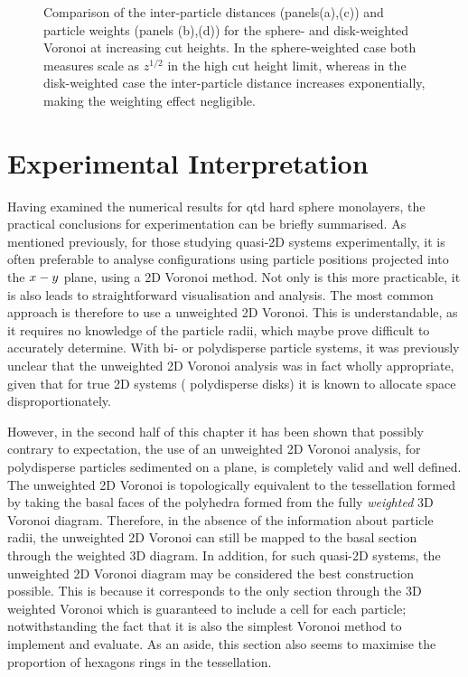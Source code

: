 \begin{figure}
	\caption{Comparison of the inter\--particle distances (panels(a),(c)) and particle weights (panels (b),(d)) for the sphere\-- and disk\--weighted Voronoi at increasing cut heights. In the sphere\--weighted case both measures scale as $z^{1/2}$ in the high cut height limit, whereas in the disk\--weighted case the inter\--particle distance increases exponentially, making the weighting effect negligible.}
	\label{fig:wd}
\end{figure}

\section{Experimental Interpretation}

Having examined the numerical results for qtd{} hard sphere monolayers, the practical conclusions for experimentation can be briefly summarised.
As mentioned previously, for those studying quasi\--2D systems experimentally, it is often preferable to analyse configurations using particle positions projected into the $x\--y$ plane, using a 2D Voronoi method.
Not only is this more practicable, it is also leads to straightforward visualisation and analysis.
The most common approach is therefore to use a unweighted 2D Voronoi.
This is understandable, as it requires no knowledge of the particle radii, which maybe prove difficult to accurately determine.
With bi\-- or polydisperse particle systems, it was previously unclear that the unweighted 2D Voronoi analysis was in fact wholly appropriate, given that for true 2D systems (\eg{} polydisperse disks) it is known to allocate space disproportionately. 
 
However, in the second half of this chapter it has been shown that possibly contrary to expectation, the use of an unweighted 2D Voronoi analysis, for polydisperse particles sedimented on a plane, is completely valid and well defined.
The unweighted 2D Voronoi is topologically equivalent to the tessellation formed by taking the basal faces of the polyhedra formed from the fully \textit{weighted} 3D Voronoi diagram.
Therefore, in the absence of the information about particle radii, the unweighted 2D Voronoi can still be mapped to the basal section through the weighted 3D diagram.
In addition, for such quasi\--2D systems, the unweighted 2D Voronoi diagram may be considered the best construction possible. 
This is because it corresponds to the only section through the 3D weighted Voronoi which is guaranteed to include a cell for each particle; notwithstanding the fact that it is also the simplest Voronoi method to implement and evaluate.
As an aside, this section also seems to maximise the proportion of hexagons rings in the tessellation.

